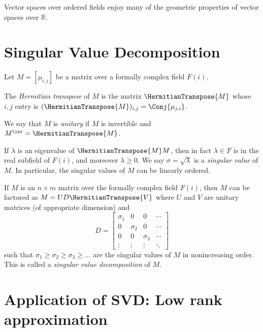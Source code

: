 \documentclass{memoir}
\begin{document}
Vector spaces over ordered fields enjoy many of the geometric properties of vector spaces over $\mathbb{R}$.

\section{Singular Value Decomposition}

\begin{dfn}
Let $M = [\mu_{i,j}]$ be a matrix over a formally complex field $F(i)$. 
\begin{enumerate*}
\item The \emph{Hermitian transpose} of $M$ is the matrix $\HermitianTranspose{M}$ whose $i,j$ entry is $(\HermitianTranspose{M})_{i,j} = \Conj{\mu_{j,i}}$.
\item We say that $M$ is \emph{unitary} if $M$ is invertible and $M^\inv = \HermitianTranspose{M}$.
\end{enumerate*}
\end{dfn}

\begin{prp}
If $\lambda$ is an eigenvalue of $\HermitianTranspose{M}M$, then in fact $\lambda \in F$ is in the real subfield of $F(i)$, and moreover $\lambda \geq 0$. We say $\sigma = \sqrt{\lambda}$ is a \emph{singular value} of $M$. In particular, the singular values of $M$ can be linearly ordered.
\end{prp}

\begin{prp}
If $M$ is an $n \times m$ matrix over the formally complex field $F(i)$, then $M$ can be factored as $M = UD\HermitianTranspose{V}$ where $U$ and $V$ are unitary matrices (of appropriate dimension) and \[ D = \begin{bmatrix} \sigma_1 & 0 & 0 & \cdots \\ 0 & \sigma_2 & 0 & \cdots \\ 0 & 0 & \sigma_3 & \cdots \\ \vdots & \vdots & \vdots & \ddots \end{bmatrix} \] such that $\sigma_1 \geq \sigma_2 \geq \sigma_3 \geq \ldots$ are the singular values of $M$ in nonincreasing order. This is called a \emph{singular value decomposition} of $M$.
\end{prp}

\section{Application of SVD: Low rank approximation}
\end{document}
